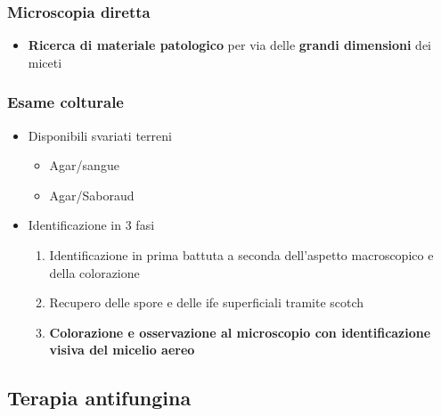 \documentclass[italian,]{article}
\providecommand{\tightlist}{%
  \setlength{\itemsep}{0pt}\setlength{\parskip}{0pt}}
\begin{document}
\hypertarget{microscopia-diretta}{%
\subsubsection{Microscopia diretta}\label{microscopia-diretta}}

\begin{itemize}
\tightlist
\item
  \textbf{Ricerca di materiale patologico} per via delle \textbf{grandi
  dimensioni} dei miceti
\end{itemize}

\hypertarget{esame-colturale-1}{%
\subsubsection{Esame colturale}\label{esame-colturale-1}}

\begin{itemize}
\tightlist
\item
  Disponibili svariati terreni

  \begin{itemize}
  \tightlist
  \item
    Agar/sangue
  \item
    Agar/Saboraud
  \end{itemize}
\item
  Identificazione in 3 fasi

  \begin{enumerate}
  \def\labelenumi{\arabic{enumi}.}
  \tightlist
  \item
    Identificazione in prima battuta a seconda dell'aspetto macroscopico
    e della colorazione
  \item
    Recupero delle spore e delle ife superficiali tramite scotch
  \item
    \textbf{Colorazione e osservazione al microscopio con
    identificazione visiva del micelio aereo}
  \end{enumerate}
\end{itemize}

\hypertarget{terapia-antifungina}{%
\subsection{Terapia antifungina}\label{terapia-antifungina}}
\end{document}
